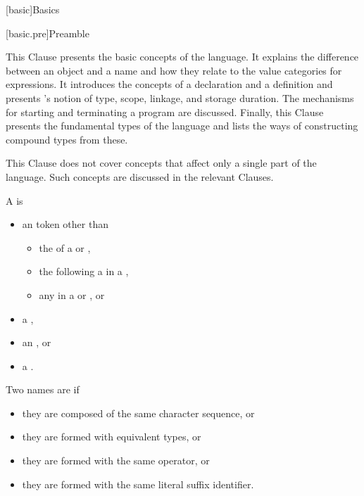 [basic]{Basics}


[basic.pre]{Preamble}
%
%
%
%
%

\pnum
\begin{note}
This Clause presents the basic concepts of the \Cpp{} language.
It explains the difference between an object and a
name and how they relate to the value categories for expressions.
It introduces the concepts of a
declaration and a definition and presents \Cpp{}'s
notion of type, scope, linkage, and
storage duration. The mechanisms for starting and
terminating a program are discussed. Finally, this Clause presents the
fundamental types of the language and lists the ways of constructing
compound types from these.
\end{note}

\pnum
\begin{note}
This Clause does not cover concepts that affect only a single
part of the language. Such concepts are discussed in the relevant
Clauses.
\end{note}

\pnum
A  is
\begin{itemize}
\item an  token other than
  \begin{itemize}
  \item
  the  of a
   or
  ,
  \item
  the  following a  in a
  ,
  \item
  any  in a
   or
  , or
  \end{itemize}
\item a ,
\item an , or
\item a .
\end{itemize}

\pnum
Two names are  if
\begin{itemize}
\item they are  composed of the same character sequence, or
\item they are  formed with
equivalent types, or
\item they are  formed with
the same operator, or
\item they are  formed with
the same literal suffix identifier.
\end{itemize}

